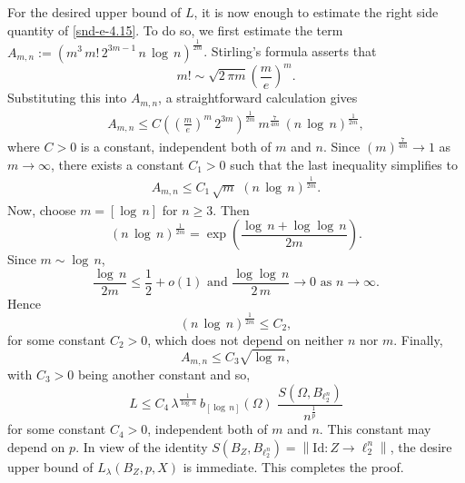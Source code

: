 \documentclass[a4paper,11pt, reqno]{amsart}
\theoremstyle{definition}
\newcommand{\norm}[1]{\left\lVert#1\right\rVert}
\begin{document}
	For the desired upper bound of $L$, it is now enough to estimate the right side quantity of \eqref{snd-e-4.15}. To do so, we first estimate the term 
	$A_{m,n}:=\left(m^3\,m!\,2^{3m-1}\,n\,\log\,n\right)^{\frac{1}{2m}}$. Stirling's formula asserts that
	$$m! \sim \sqrt{2\, \pi m} \left(\frac{m}{e}\right)^m.
	$$
	Substituting this into $A_{m,n}$, a straightforward calculation gives
	\begin{align*}
		A_{m,n} \leq C \left(\left(\frac{m}{e}\right)^m\, 2^{3m}\right)^{\frac{1}{2m}}\, m^{\frac{7}{4m}}\,(n\, \log \,n)^{\frac{1}{2m}},
	\end{align*} 
	where $C>0$ is a constant, independent both of $m$ and $n$. Since $( m)^{\frac{7}{4m}} \rightarrow 1$ as $m \rightarrow \infty$, there exists a constant $C_1>0$ such that the last inequality simplifies to
	\begin{align*}
		A_{m,n} \leq C_1 \, \sqrt{m}\,  \,(n\, \log \,n)^{\frac{1}{2m}}. 
	\end{align*}
	Now, choose $m=[\log\, n]$ for $n \geq 3$. Then
	\begin{equation*}
		(n\, \log \,n)^{\frac{1}{2m}}= \exp \left(\frac{\log \,n + \log\log \,n}{2m}\right).
	\end{equation*}
	Since $m \sim \log \, n$,
	\begin{equation*}
		\frac{\log \,n}{2m} \leq \frac{1}{2} + o(1)\,\, \mbox{and} \, \, \frac{\log\log \,n}{2\, m} \rightarrow 0\,\, \mbox{as}\,\,n \rightarrow \infty.
	\end{equation*}
	Hence
	\begin{equation*}
		(n\, \log \,n)^{\frac{1}{2m}} \leq C_2,
	\end{equation*}
	for some constant $C_2>0$, which does not depend on neither $n$ nor $m$. Finally,
	\begin{equation*}
		A_{m,n} \leq C_3 \sqrt{\log \, n},
	\end{equation*}
	with $C_3>0$ being another constant and so,
	\begin{equation*}
		L\leq C_4 \, \lambda^{\frac{1}{\log \,n}}\,b_{[\log\,n]}(\Omega)\, \,\frac{S(\Omega,B_{\ell^n_2})}{n^{\frac{1}{p}}}
	\end{equation*}
	for some constant $C_4>0$, independent both of $m$ and $n$. This constant may depend on $p$. In view of the identity $S(B_Z,B_{\ell^n_2})=\norm{\mathrm{Id}:Z \rightarrow \ell^n_2}$, the desire upper bound of $L_{\lambda}(B_{Z}, p,X)$ is immediate. This completes the proof.
\end{document}
